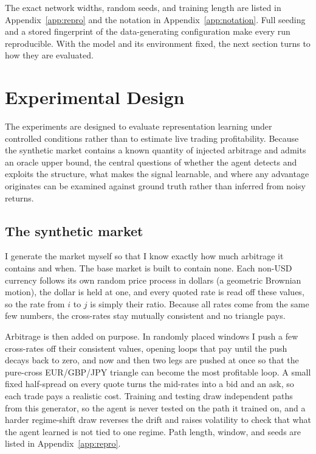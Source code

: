 \documentclass[12pt,a4paper]{article}
\begin{document}
The exact network widths, random seeds, and training length are listed in
Appendix~\ref{app:repro} and the notation in Appendix~\ref{app:notation}. Full seeding and a
stored fingerprint of the data-generating configuration make every run reproducible. With the
model and its environment fixed, the next section turns to how they are evaluated.

\section{Experimental Design}
\label{sec:design}

The experiments are designed to evaluate representation learning under controlled conditions
rather than to estimate live trading profitability. Because the synthetic market contains a
known quantity of injected arbitrage and admits an oracle upper bound, the central
questions of whether the agent detects and exploits the structure, what makes the signal
learnable, and where any advantage originates can be examined against ground truth rather
than inferred from noisy returns.

\subsection{The synthetic market}

I generate the market myself so that I know exactly how much arbitrage it contains and
when. The base market is built to contain none. Each non-USD currency follows its own random
price process in dollars (a geometric Brownian motion), the dollar is held at one, and every
quoted rate is read off these values, so the rate from $i$ to $j$ is simply their ratio. Because
all rates come from the same few numbers, the cross-rates stay mutually consistent and no
triangle pays.

Arbitrage is then added on purpose. In randomly placed windows I push a few cross-rates off
their consistent values, opening loops that pay until the push decays back to zero, and now and
then two legs are pushed at once so that the pure-cross EUR/GBP/JPY triangle can become the most
profitable loop. A small fixed half-spread on every quote turns the mid-rates into a bid and an
ask, so each trade pays a realistic cost. Training and testing draw independent paths from this
generator, so the agent is never tested on the path it trained on, and a harder regime-shift
draw reverses the drift and raises volatility to check that what the agent learned is not tied to
one regime. Path length, window, and seeds are listed in Appendix~\ref{app:repro}.
\end{document}
